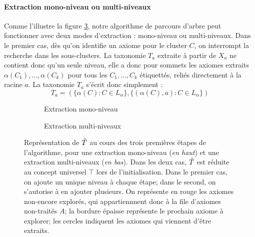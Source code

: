 \paragraph{Extraction mono-niveau ou multi-niveaux}


Comme l'illustre la figure \ref{fig:texp-tree-expansion}, notre algorithme de parcours d'arbre peut fonctionner avec deux modes d'extraction : mono-niveau ou multi-niveaux. Dans le premier cas, dès qu'on identifie un axiome pour le cluster $C$, on interrompt la recherche dans les sous-clusters. La taxonomie $T_a$ extraite à partir de $X_a$ ne contient donc qu'un seule niveau, elle a donc pour sommets les axiomes extraits $\alpha(C_1), \ldots, \alpha(C_k)$ pour tous les $C_1, \ldots, C_k$ étiquettés, reliés directement à la racine $a$. La taxonomie $T_a$ s'écrit donc simplement :
\begin{equation}
    T_a = ( \{ \alpha(C) : C \in L_\alpha \}, \{ (\alpha(C), a) : C \in L_\alpha \} )
\end{equation}

\begin{figure}[h]
    \centering
    
    \begin{subfigure}{\textwidth}
        \centering
        
        \caption{Extraction mono-niveau}
        \label{subfig:tree-singlelevel}
    \end{subfigure}
    
    \begin{subfigure}{\textwidth}
        \centering
        
        \caption{Extraction multi-niveaux}
        \label{subfig:tree-multilevel}
    \end{subfigure}
    
    \caption[Extraction mono-niveau et extraction multi-niveaux]{Représentation de $\hat{T}$ au cours des trois premières étapes de l'algorithme, pour une extraction mono-niveau (\textit{en haut}) et une extraction multi-niveaux (\textit{en bas}). Dans les deux cas, $\hat{T}$ est réduite au concept universel $\top$ lors de l'initialisation. Dans le premier cas, on ajoute un unique niveau à chaque étape; dans le second, on s'autorise à en ajouter plusieurs. On représente en rouge les axiomes non-encore explorés, qui appartiennnent donc à la file d'axiomes non-traités $A$; la bordure épaisse représente le prochain axiome à explorer; les cercles indiquent les axiomes qui viennent d'être extraits.}
    \label{fig:texp-tree-expansion}
\end{figure}


